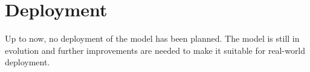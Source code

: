 
\chapter{Deployment}

Up to now, no deployment of the model has been planned. The model is still in evolution and further improvements are needed to make it suitable for real-world deployment.